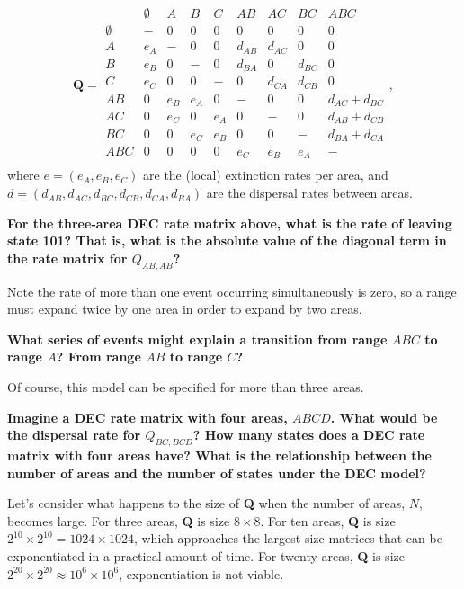 \[
\textbf{Q} = 
	\begin{array}{c|cccccccc}
		& \emptyset & A & B & C & AB & AC & BC & ABC \\
		\hline
		\emptyset & - & 0 & 0 & 0 & 0 & 0 & 0 & 0 \\
		A & e_A & - & 0 & 0 & d_{AB} & d_{AC} & 0 & 0 \\
		B & e_B & 0 & - & 0 & d_{BA} & 0 & d_{BC} & 0 \\
		C & e_C & 0 & 0 & - & 0 & d_{CA} & d_{CB} & 0 \\
		AB & 0 & e_B & e_A & 0 & - & 0 & 0 & d_{AC} + d_{BC} \\
		AC & 0 & e_C & 0 & e_A & 0 & - & 0 & d_{AB} + d_{CB} \\
		BC & 0 & 0 & e_C & e_B & 0 & 0 & - & d_{BA} + d_{CA} \\
		ABC & 0 & 0 & 0 & 0 & e_C & e_B & e_A & - \\								
	\end{array},
\]
where $e = ( e_A, e_B, e_C )$ are the (local) extinction rates per area, and $d = ( d_{AB}, d_{AC}, d_{BC}, d_{CB}, d_{CA}, d_{BA})$ are the dispersal rates between areas.

{\bf {} For the three-area DEC rate matrix above, what is the rate of leaving state 101? That is, what is the absolute value of the diagonal term in the rate matrix for $Q_{AB,AB}$? }

Note the rate of more than one event occurring simultaneously is zero, so a range must expand twice by one area in order to expand by two areas.

{\bf {} What series of events might explain a transition from range $ABC$ to range $A$? From range $AB$ to range $C$?}

Of course, this model can be specified for more than three areas.

{ \bf {} Imagine a DEC rate matrix with four areas, $ABCD$. What would be the dispersal rate for $Q_{BC,BCD}$? How many states does a DEC rate matrix with four areas have? What is the relationship between the number of areas and the number of states under the DEC model? }

Let's consider what happens to the size of \textbf{Q} when the number of areas, $N$, becomes large.
For three areas, \textbf{Q} is size $8 \times 8$.
For ten areas, \textbf{Q} is size $2^{10} \times 2^{10} = 1024 \times 1024$, which approaches the largest size matrices that can be exponentiated in a practical amount of time.
For twenty areas, \textbf{Q} is size $2^{20} \times 2^{20} \approx 10^6 \times 10^6$, exponentiation is not viable.


